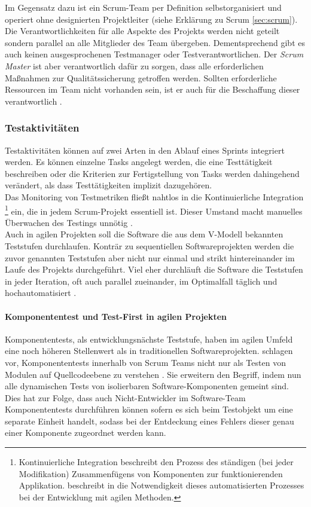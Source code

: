 Im Gegensatz dazu ist ein Scrum-Team per Definition selbstorganisiert und operiert ohne designierten Projektleiter (siehe Erklärung zu Scrum \ref{sec:scrum}). Die Verantwortlichkeiten für alle Aspekte des Projekts werden nicht geteilt sondern parallel an alle Mitglieder des Team übergeben. Dementsprechend gibt es auch keinen ausgesprochenen Testmanager oder Testverantwortlichen. Der \textit{Scrum Master} ist aber verantwortlich dafür zu sorgen, dass alle erforderlichen Maßnahmen zur Qualitätssicherung getroffen werden. Sollten erforderliche Ressourcen im Team nicht vorhanden sein, ist er auch für die Beschaffung dieser verantwortlich \cite{linz_testing_2014}.\\

\subsubsection{Testaktivitäten}
Testaktivitäten können auf zwei Arten in den Ablauf eines Sprints integriert werden. Es können einzelne Tasks angelegt werden, die eine Testtätigkeit beschreiben oder die Kriterien zur Fertigstellung von Tasks werden dahingehend verändert, als dass Testtätigkeiten implizit dazugehören.\\
Das Monitoring von Testmetriken fließt nahtlos in die Kontinuierliche Integration \footnote{Kontinuierliche Integration beschreibt den Prozess des ständigen (bei jeder Modifikation) Zusammenfügens von Komponenten zur funktionierenden Applikation. \citeauthor{linz_testing_2014} beschreibt in \cite{linz_testing_2014} die Notwendigkeit dieses automatisierten Prozesses bei der Entwicklung mit agilen Methoden.} ein, die in jedem Scrum-Projekt essentiell ist. Dieser Umstand macht manuelles Überwachen des Testings unnötig \cite{linz_testing_2014}.\\
Auch in agilen Projekten soll die Software die aus dem V-Modell bekannten Teststufen durchlaufen. Konträr zu sequentiellen Softwareprojekten werden die zuvor genannten Teststufen aber nicht nur einmal und strikt hintereinander im Laufe des Projekts durchgeführt. Viel eher durchläuft die Software die Teststufen in jeder Iteration, oft auch parallel zueinander, im Optimalfall täglich und hochautomatisiert \cite{linz_testing_2014}.

\paragraph{Komponententest und Test-First in agilen Projekten}   
Komponententests, als entwicklungsnächste Teststufe, haben im agilen Umfeld eine noch höheren Stellenwert als in traditionellen Softwareprojekten. \citeauthor{spillner_software_2014} schlagen vor, Komponententests innerhalb von Scrum Teams nicht nur als Testen von Modulen auf Quellcodeebene zu verstehen \cite{spillner_software_2014}. Sie erweitern den Begriff, indem nun alle dynamischen Tests von isolierbaren Software-Komponenten gemeint sind. Dies hat zur Folge, dass auch Nicht-Entwickler im Software-Team Komponententests durchführen können sofern es sich beim Testobjekt um eine separate Einheit handelt, sodass bei der Entdeckung eines Fehlers dieser genau einer Komponente zugeordnet werden kann.\\

